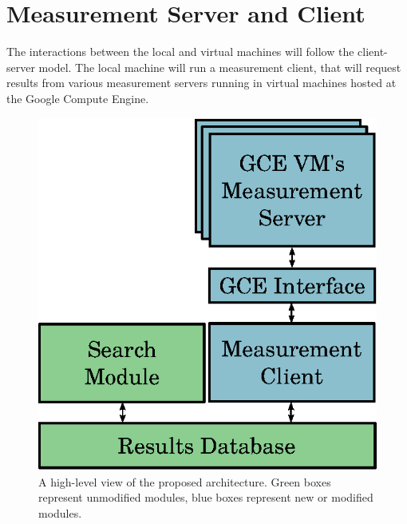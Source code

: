 \documentclass[a4paper, 12pt]{article}
\begin{document}
\section{Measurement Server and Client}
\label{sec:ext}

The interactions between the local and virtual machines will follow the
client-server model. The local machine will run a measurement client, that will
request results from various measurement servers running in virtual machines
hosted at the Google Compute Engine.

\begin{figure}[htpb]
    \centering
    \begin{minipage}{.45\textwidth}
        \centering
        \includegraphics[scale=.62]{high-level-implementation}
        \caption{A high-level view of the proposed architecture.
        Green boxes represent unmodified modules, blue boxes represent
        new or modified modules.}
        \label{fig:high-level}
    \end{minipage}%
    \hfill
    \begin{minipage}{.45\textwidth}
        \centering

\end{minipage}
\end{figure}
\end{document}
